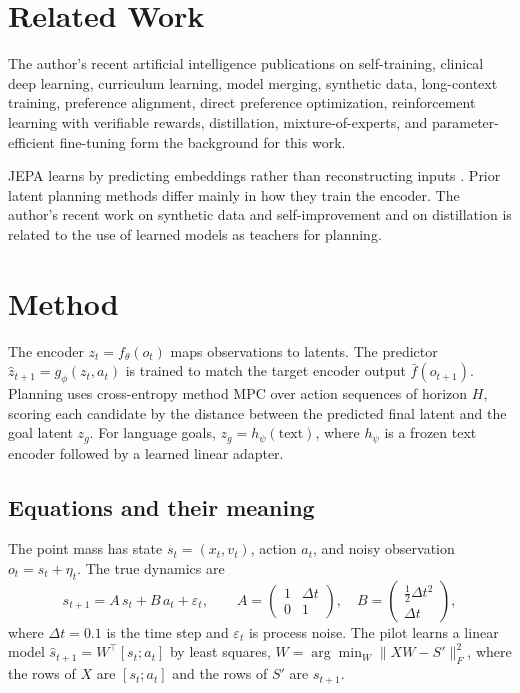 \documentclass[conference]{IEEEtran}
\begin{document}
\section{Related Work}
The author's recent artificial intelligence publications on self-training, clinical deep learning, curriculum learning, model merging, synthetic data, long-context training, preference alignment, direct preference optimization, reinforcement learning with verifiable rewards, distillation, mixture-of-experts, and parameter-efficient fine-tuning \cite{d1selftraining,d2glaucoma,d3curriculum,d4merging,d5synthetic,d6longcontext,d7rlaif,d8distillation,d9moe,d10peft,d11dpo,d12rlvr} form the background for this work.

JEPA learns by predicting embeddings rather than reconstructing inputs \cite{bardes2024vjepa}. Prior latent planning methods differ mainly in how they train the encoder. The author's recent work on synthetic data and self-improvement \cite{d5synthetic} and on distillation \cite{d8distillation} is related to the use of learned models as teachers for planning.

\section{Method}
The encoder $z_t = f_\theta(o_t)$ maps observations to latents. The predictor $\hat{z}_{t+1} = g_\phi(z_t, a_t)$ is trained to match the target encoder output $\bar{f}(o_{t+1})$. Planning uses cross-entropy method MPC over action sequences of horizon $H$, scoring each candidate by the distance between the predicted final latent and the goal latent $z_g$. For language goals, $z_g = h_\psi(\text{text})$, where $h_\psi$ is a frozen text encoder followed by a learned linear adapter.

\subsection*{Equations and their meaning}
The point mass has state $s_t=(x_t,v_t)$, action $a_t$, and noisy observation $o_t=s_t+\eta_t$. The true dynamics are
\begin{equation}
s_{t+1}=A\,s_t+B\,a_t+\varepsilon_t,\qquad A=\begin{pmatrix}1&\Delta t\\0&1\end{pmatrix},\quad B=\begin{pmatrix}\tfrac12\Delta t^2\\ \Delta t\end{pmatrix},
\end{equation}
where $\Delta t=0.1$ is the time step and $\varepsilon_t$ is process noise. The pilot learns a linear model $\hat s_{t+1}=W^\top[s_t;a_t]$ by least squares, $W=\arg\min_W\lVert XW-S'\rVert_F^2$, where the rows of $X$ are $[s_t;a_t]$ and the rows of $S'$ are $s_{t+1}$.
\end{document}
